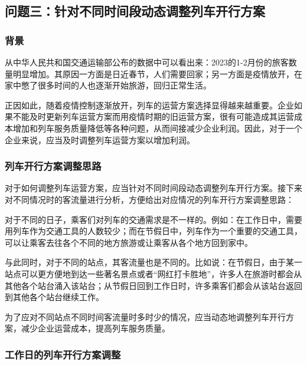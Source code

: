\subsubsection{}

\subsection{问题三：针对不同时间段动态调整列车开行方案}

\subsubsection{背景}

从中华人民共和国交通运输部公布的数据中可以看出来：2023的1-2月份的旅客数量明显增加\cite{ChengShiKeYunTongJiShuJuZhongHuaRenMinGongHeGuoJiaoTongYunShuBu}。其原因一方面是日近春节，人们需要回家；另一方面是疫情放开，在家中憋了很多时间的人也逐渐开始旅游，回归正常生活。

正因如此，随着疫情控制逐渐放开，列车的运营方案选择显得越来越重要。企业如果不能及时更新列车运营方案而用疫情时期的旧运营方案，很有可能造成其运营成本增加和列车服务质量降低等各种问题，从而间接减少企业利润。因此，对于一个企业来说，应当及时调整列车运营方案以增加利润。

\subsubsection{列车开行方案调整思路}

对于如何调整列车运营方案，应当针对不同时间段动态调整列车开行方案。接下来对不同情况时的客流量进行分析，方便给出对应情况的列车开行方案调整思路：

对于不同的日子，乘客们对列车的交通需求是不一样的。例如：在工作日中，需要用列车作为交通工具的人数较少；而在节假日中，列车作为一个重要的交通工具，可以让乘客去往各个不同的地方旅游或让乘客从各个地方回到家中。

与此同时，对于不同的站点，其客流量也是不同的。比如说：在节假日，由于某一站点可以更方便地到达一些著名景点或者“网红打卡胜地”，许多人在旅游时都会从其他各个站台涌入该站台；从节假日回到工作日时，许多乘客们都会从该站台返回到其他各个站台继续工作。

为了应对不同站点不同时间客流量时多时少的情况，应当动态地调整列车开行方案，减少企业运营成本，提高列车服务质量。

\subsubsection{工作日的列车开行方案调整}

